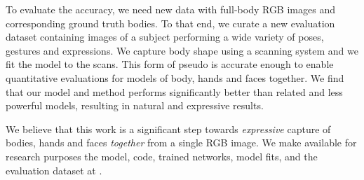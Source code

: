 To evaluate the accuracy, we need new data with full-body RGB images and corresponding \threeD ground truth bodies.
To that end, we curate a new evaluation dataset containing images of a subject performing a wide variety of poses, gestures and expressions.
We capture \threeD body shape using a scanning system and we fit the \smplHF model to the scans.
This form of pseudo \gt is accurate enough to enable quantitative evaluations for models of body, hands and faces together. 
We find that our model and method performs significantly better than related and less powerful models, resulting in natural and expressive results. 

We believe that this work is a significant step towards \emph{expressive} capture of bodies, hands and faces \emph{together} from a single RGB image. 
We make available for research purposes the \smplHF model, \smplifyPP code, trained networks, model fits, and the evaluation dataset at \websiteSMPLX.

